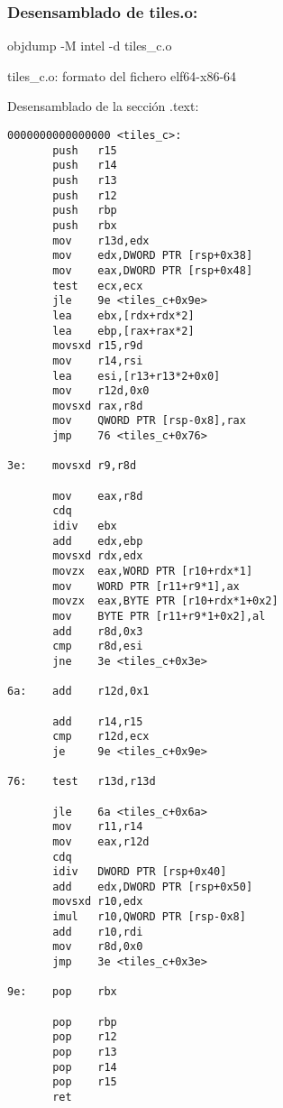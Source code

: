 \subsubsection{Desensamblado de tiles.o:}
objdump -M intel -d tiles_c.o

tiles_c.o:     formato del fichero elf64-x86-64

Desensamblado de la sección .text:

\begin{codesnippet}
\begin{verbatim}
0000000000000000 <tiles_c>:
       push   r15
       push   r14
       push   r13
       push   r12
       push   rbp
       push   rbx
       mov    r13d,edx
       mov    edx,DWORD PTR [rsp+0x38]
       mov    eax,DWORD PTR [rsp+0x48]
       test   ecx,ecx
       jle    9e <tiles_c+0x9e>
       lea    ebx,[rdx+rdx*2]
       lea    ebp,[rax+rax*2]
       movsxd r15,r9d
       mov    r14,rsi
       lea    esi,[r13+r13*2+0x0]
       mov    r12d,0x0
       movsxd rax,r8d
       mov    QWORD PTR [rsp-0x8],rax
       jmp    76 <tiles_c+0x76>
    
3e:    movsxd r9,r8d
    
       mov    eax,r8d
       cdq    
       idiv   ebx
       add    edx,ebp
       movsxd rdx,edx
       movzx  eax,WORD PTR [r10+rdx*1]
       mov    WORD PTR [r11+r9*1],ax
       movzx  eax,BYTE PTR [r10+rdx*1+0x2]
       mov    BYTE PTR [r11+r9*1+0x2],al
       add    r8d,0x3
       cmp    r8d,esi
       jne    3e <tiles_c+0x3e>
    
6a:    add    r12d,0x1
    
       add    r14,r15
       cmp    r12d,ecx
       je     9e <tiles_c+0x9e>
    
76:    test   r13d,r13d

       jle    6a <tiles_c+0x6a>
       mov    r11,r14
       mov    eax,r12d
       cdq    
       idiv   DWORD PTR [rsp+0x40]
       add    edx,DWORD PTR [rsp+0x50]
       movsxd r10,edx
       imul   r10,QWORD PTR [rsp-0x8]
       add    r10,rdi
       mov    r8d,0x0
       jmp    3e <tiles_c+0x3e>
       
9e:    pop    rbx
  
       pop    rbp
       pop    r12
       pop    r13
       pop    r14
       pop    r15
       ret    
\end{verbatim}
\end{codesnippet}
